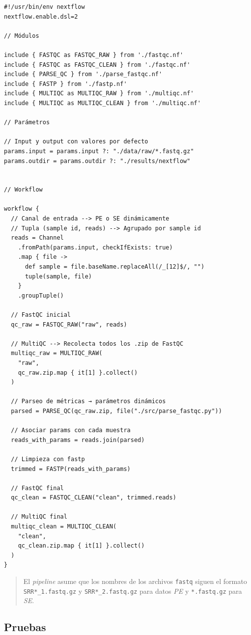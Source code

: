 \documentclass[
  letterpaper,
  DIV=11,
  numbers=noendperiod]{scrartcl}
\begin{document}
\begin{verbatim}
#!/usr/bin/env nextflow
nextflow.enable.dsl=2

// Módulos

include { FASTQC as FASTQC_RAW } from './fastqc.nf'
include { FASTQC as FASTQC_CLEAN } from './fastqc.nf'
include { PARSE_QC } from './parse_fastqc.nf'
include { FASTP } from './fastp.nf'
include { MULTIQC as MULTIQC_RAW } from './multiqc.nf'
include { MULTIQC as MULTIQC_CLEAN } from './multiqc.nf'

// Parámetros

// Input y output con valores por defecto
params.input = params.input ?: "./data/raw/*.fastq.gz"
params.outdir = params.outdir ?: "./results/nextflow"


// Workflow

workflow {
  // Canal de entrada --> PE o SE dinámicamente
  // Tupla (sample id, reads) --> Agrupado por sample id
  reads = Channel
    .fromPath(params.input, checkIfExists: true)
    .map { file ->
      def sample = file.baseName.replaceAll(/_[12]$/, "")
      tuple(sample, file)
    }
    .groupTuple()

  // FastQC inicial
  qc_raw = FASTQC_RAW("raw", reads)

  // MultiQC --> Recolecta todos los .zip de FastQC
  multiqc_raw = MULTIQC_RAW(
    "raw",
    qc_raw.zip.map { it[1] }.collect()
  )

  // Parseo de métricas → parámetros dinámicos
  parsed = PARSE_QC(qc_raw.zip, file("./src/parse_fastqc.py"))

  // Asociar params con cada muestra
  reads_with_params = reads.join(parsed)

  // Limpieza con fastp
  trimmed = FASTP(reads_with_params)

  // FastQC final
  qc_clean = FASTQC_CLEAN("clean", trimmed.reads)

  // MultiQC final
  multiqc_clean = MULTIQC_CLEAN(
    "clean",
    qc_clean.zip.map { it[1] }.collect()
  )
}
\end{verbatim}

\begin{quote}
El \emph{pipeline} asume que los nombres de los archivos \texttt{fastq}
siguen el formato \texttt{SRR*\_1.fastq.gz} y \texttt{SRR*\_2.fastq.gz}
para datos \emph{PE} y \texttt{*.fastq.gz} para \emph{SE}.
\end{quote}

\subsection{Pruebas}\label{pruebas}
\end{document}
